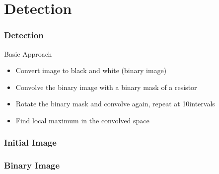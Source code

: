 \documentclass{beamer}
\begin{document}
\section{Detection} 

\begin{frame}
\frametitle{Detection}
\begin{block}{Basic Approach}
\begin{itemize}
\item Convert image to black and white (binary image)
\item Convolve the binary image with a binary mask of a resistor
\item Rotate the binary mask and convolve again, repeat at 10\degree intervals
\item Find local maximum in the convolved space
\end{itemize}
\end{block}
\end{frame}


\begin{frame}
\frametitle{Initial Image}
\begin{center}
\end{center}
\end{frame}


\begin{frame}
\frametitle{Binary Image}
\begin{center}
\end{center}
\end{frame}
\end{document}
